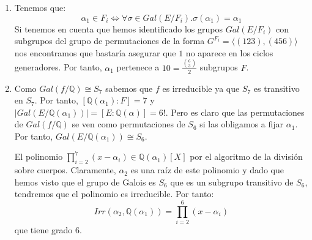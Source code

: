 \begin{enumerate}
\item Tenemos que: $$\alpha_1 \in F_i \iff \forall \sigma \in Gal(E/F_i).\sigma(\alpha_1) = \alpha_1$$ Si tenemos en cuenta que hemos identificado los grupos $Gal(E/F_i)$ con subgrupos del grupo de permutaciones de la forma $G^{F_i} = \langle (123),(456) \rangle$ nos encontramos que bastaría asegurar que $1$ no aparece en los ciclos generadores. Por tanto, $\alpha_1$ pertenece a $10 = \frac{\binom{6}{3}}{2}$ subgrupos $F$.

\item Como $Gal(f/\mathbb{Q}) \cong S_7$ sabemos que $f$ es irreducible ya que $S_7$ es transitivo en $S_7$. Por tanto, $[\mathbb{Q}(\alpha_1):F] = 7$ y $|Gal(E/\mathbb{Q}(\alpha_1))| = [E:\mathbb{Q}(\alpha)] = 6!$. Pero es claro que las permutaciones de $Gal(f/\mathbb{Q})$ se ven como permutaciones de $S_{6}$ si las obligamos a fijar $\alpha_1$. Por tanto, $Gal(E/\mathbb{Q}(\alpha_1)) \cong S_6$.

El polinomio $\prod_{i = 2}^7 (x-\alpha_i) \in \mathbb{Q}(\alpha_1)[X]$ por el algoritmo de la división sobre cuerpos. Claramente, $\alpha_2$ es una raíz de este polinomio y dado que hemos visto que el grupo de Galois es $S_6$ que es un subgrupo transitivo de $S_6$, tendremos que el polinomio es irreducible. Por tanto: $$Irr(\alpha_2,\mathbb{Q}(\alpha_1)) = \prod_{i = 2}^6 (x-\alpha_i)$$ que tiene grado 6. 
\end{enumerate}